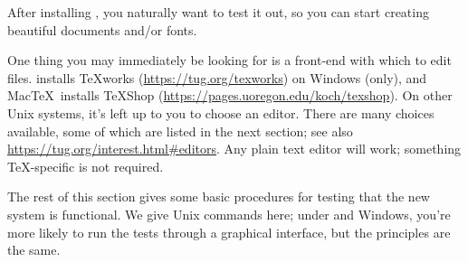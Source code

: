 \documentclass[12pt]{article}
\begin{document}
After installing \TL{}, you naturally want to test it out, so you can
start creating beautiful documents and\slash or fonts.

One thing you may immediately be looking for is a front-end with which
to edit files.  \TL{} installs \TeX{}works
(\url{https://tug.org/texworks}) on Windows (only), and Mac\TeX\ installs
TeXShop (\url{https://pages.uoregon.edu/koch/texshop}).  On other Unix
systems, it's left up to you to choose an editor.  There are many
choices available, some of which are listed in the next section; see
also \url{https://tug.org/interest.html#editors}.  Any plain text editor
will work; something \TeX-specific is not required.

The rest of this section gives some basic procedures for testing that
the new system is functional.  We give Unix commands here; under
\macOS{} and Windows, you're more likely to run the tests through a
graphical interface, but the principles are the same.
\end{document}
